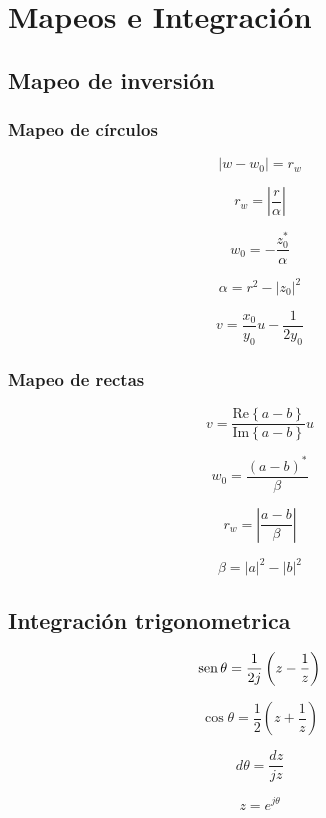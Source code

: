 
\chapter*{Mapeos e Integración}

\begin{minipage}[t]{0.5\textwidth}

\section*{Mapeo de inversión}

\subsection*{Mapeo de círculos}

$$ \left| w-w_0 \right| = r_w $$

$$ r_w = \left| \frac{r}{\alpha} \right| $$

$$ w_0 = -\frac{z_0^*}{\alpha} $$

$$ \alpha = r^2-|z_0|^2 $$

$$ v = \frac{x_0}{y_0}u-\frac{1}{2y_0} $$

\subsection*{Mapeo de rectas}
 
$$ v = \frac{ \mathrm{Re}  \left \{ a-b \right \} }
{\mathrm{Im}   \left \{ a-b \right \} }u $$

$$ w_0 = \frac{(a-b)^*}{\beta} $$

$$ r_w = \left| \frac{a-b}{\beta} \right| $$

$$ \beta = |a|^2 - |b|^2 $$

\end{minipage}  \begin{minipage}[t]{0.5\textwidth}

\section*{Integración trigonometrica}

$$ \operatorname{sen} \theta = \frac{1}{2j}\left( z-\frac{1}{z} \right) $$

$$ \cos \theta = \frac{1}{2}\left( z+\frac{1}{z} \right) $$

$$ d\theta = \frac{dz}{jz} $$

$$ z = e^{j\theta} $$

\end{minipage}
